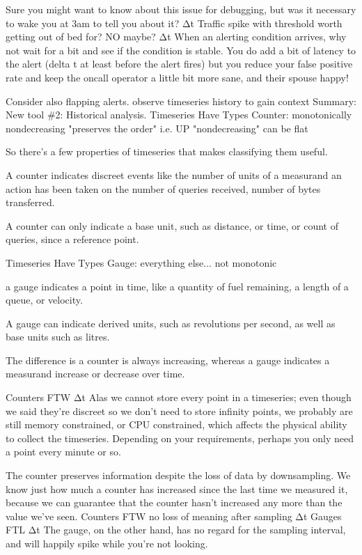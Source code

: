 \documentclass[online,12pt,helvetica]{chaksem}
\begin{document}
Sure you might want to know about this issue for debugging, but was it necessary to wake you at 3am to tell you about it?
Δt
Traffic spike with threshold
worth getting out of bed for?
NO
maybe?
Δt
When an alerting condition arrives, why not wait for a bit and see if the condition is stable.  You do add a bit of latency to the alert (delta t at least before the alert fires) but you reduce your false positive rate and keep the oncall operator a little bit more sane, and their spouse happy!

Consider also flapping alerts.
observe timeseries history to gain context
Summary: New tool {\#}2: Historical analysis.
Timeseries Have Types
Counter: monotonically nondecreasing
  "preserves the order" i.e. UP
  "nondecreasing" can be flat

So there's a few properties of timeseries that makes classifying them useful.

A counter indicates discreet events like the number of units of a measurand an action has been taken on
 the number of queries received, number of bytes transferred.


A counter can only indicate a base unit, such as distance, or time, or count of
queries, since a reference point.

Timeseries Have Types
Gauge: everything else... not monotonic


a gauge indicates a point in time, like a quantity of fuel remaining, a
length of a queue, or velocity.

A gauge can indicate derived units, such as revolutions per second, as well as
base units such as litres.


The difference is a counter is always increasing, whereas a gauge indicates a
measurand increase or decrease over time.



Counters FTW
Δt
Alas we cannot store every point in a timeseries; even though we said they're discreet so we don't need to store infinity points, we probably are still memory constrained, or CPU constrained, which affects the physical ability to collect the timeseries.  Depending on your requirements, perhaps you only need a point every minute or so.

The counter preserves information despite the loss of data by downsampling.  We know just how much a counter has increased since the last time we measured it, because we can guarantee that the counter hasn't increased any more than the value we've seen.
Counters FTW
no loss of meaning after sampling
Δt
Gauges FTL
Δt
The gauge, on the other hand, has no regard for the sampling interval, and will happily spike while you're not looking.
\end{document}
